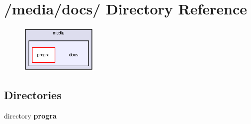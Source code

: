 \section{/media/docs/ Directory Reference}
\label{dir_000001}


\begin{figure}[H]
\begin{center}
\leavevmode
\includegraphics[width=105pt]{dir_000001_dep}
\end{center}
\end{figure}
\subsection*{Directories}
\begin{CompactItemize}
\item 
directory {\bf progra}
\end{CompactItemize}
